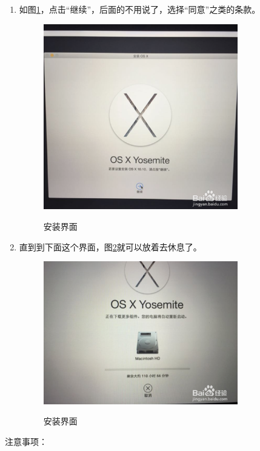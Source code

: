 \documentclass{article}
\begin{document}
\begin{enumerate}
\item 如图\ref{jixuanzhuang}，点击“继续”，后面的不用说了，选择“同意”之类的条款。
 \begin{figure}[!htb] %
 \centering
 \includegraphics[width=0.8\textwidth]{figures/jixu.png}
 \label{jixuanzhuang}
 \caption{安装界面}
 \end{figure}

\item 直到到下面这个界面，图\ref{anzhuang}就可以放着去休息了。
 \begin{figure}[!htb] %
 \centering
 \includegraphics[width=0.8\textwidth]{figures/anzhuang.png}
 \label{anzhuang}
 \caption{安装界面}
 \end{figure}

\end{enumerate}

注意事项：
\end{document}
